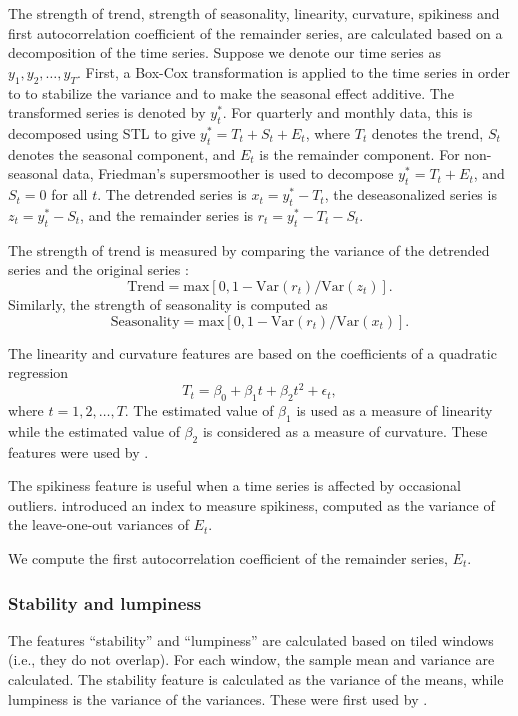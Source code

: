 \documentclass[11pt,a4paper,]{article}
\def\var{\text{Var}}
\theoremstyle{definition}
\theoremstyle{definition}
\theoremstyle{definition}
\theoremstyle{remark}
\begin{document}
The strength of trend, strength of seasonality, linearity, curvature,
spikiness and first autocorrelation coefficient of the remainder series,
are calculated based on a decomposition of the time series. Suppose we
denote our time series as \(y_1, y_2, \dots,y_T\). First, a Box-Cox
transformation is applied to the time series in order to to stabilize
the variance and to make the seasonal effect additive. The transformed
series is denoted by \(y_{t}^*\). For quarterly and monthly data, this
is decomposed using STL \autocite{cleveland1990stl} to give
\(y_t^*=T_t+S_t+E_t\), where \(T_t\) denotes the trend, \(S_t\) denotes
the seasonal component, and \(E_t\) is the remainder component. For
non-seasonal data, Friedman's supersmoother \autocite{supsmu} is used to
decompose \(y_t^*=T_t+E_t\), and \(S_t=0\) for all \(t\). The detrended
series is \(x_t=y_t^*-T_t\), the deseasonalized series is
\(z_t=y_t^*-S_t\), and the remainder series is \(r_t=y_t^*-T_t-S_t\).

The strength of trend is measured by comparing the variance of the
detrended series and the original series \autocite{wang2009rule}: \[
    \text{Trend} = \text{max}\left[0, 1 - \var(r_{t})/\var(z_{t})\right].
\] Similarly, the strength of seasonality is computed as \[
    \text{Seasonality} = \text{max}\left[0, 1- \var(r_{t})/ \var(x_{t})\right].
\]

The linearity and curvature features are based on the coefficients of a
quadratic regression \[
  T_t=\beta_0+\beta_1 t + \beta_2t^2+\epsilon_t,
\] where \(t=1, 2, \dots,T\). The estimated value of \(\beta_1\) is used
as a measure of linearity while the estimated value of \(\beta_2\) is
considered as a measure of curvature. These features were used by
\textcite{hyndman2015large}.

The spikiness feature is useful when a time series is affected by
occasional outliers. \textcite{hyndman2015large} introduced an index to
measure spikiness, computed as the variance of the leave-one-out
variances of \(E_t\).

We compute the first autocorrelation coefficient of the remainder
series, \(E_t\).

\subsubsection*{Stability and lumpiness}\label{stability-and-lumpiness}

The features ``stability'' and ``lumpiness'' are calculated based on
tiled windows (i.e., they do not overlap). For each window, the sample
mean and variance are calculated. The stability feature is calculated as
the variance of the means, while lumpiness is the variance of the
variances. These were first used by \textcite{hyndman2015large}.
\end{document}
